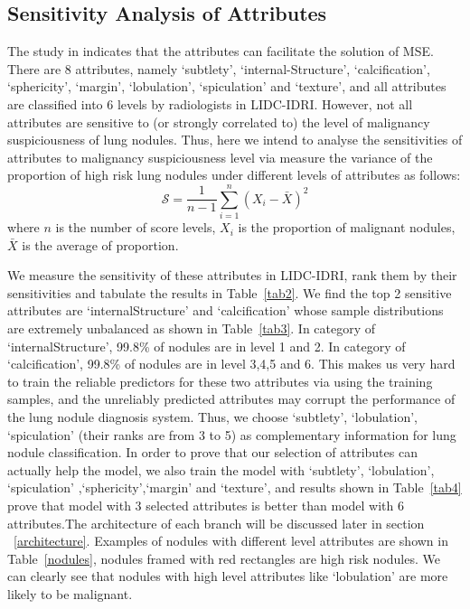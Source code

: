 \documentclass[runningheads]{llncs}
\begin{document}
\subsection{Sensitivity Analysis of Attributes}
\label{select}
The study in \cite{Hussein2017Risk} indicates that the attributes can facilitate the solution of MSE. There are 8 attributes, namely `subtlety', `internal-Structure', `calcification', `sphericity', `margin', `lobulation', `spiculation' and `texture', and all attributes are classified into 6 levels by radiologists in LIDC-IDRI. However, not all attributes are sensitive to (or strongly correlated to) the level of malignancy suspiciousness of lung nodules. Thus, here we intend to analyse the sensitivities of attributes to malignancy suspiciousness level via measure the variance of the proportion of high risk lung nodules under different levels of attributes as follows:
\begin{equation}
\mathcal{S} = \frac{1}{n-1}\sum_{i=1}^n (X_i - \bar{X})^{2}
\end{equation}
where $n$ is the number of score levels,  $X_i$ is the proportion of malignant nodules, $\bar{X}$ is the average of proportion.

We measure the sensitivity of these attributes in LIDC-IDRI, rank them by their sensitivities and tabulate the results in Table~\ref{tab2}. We find the top 2 sensitive attributes are `internalStructure' and `calcification' whose sample distributions are extremely unbalanced as shown in Table~\ref{tab3}.  In category of `internalStructure', 99.8\% of nodules are in level 1 and 2. In category of `calcification', 99.8\% of nodules are in level 3,4,5 and 6. This makes us very hard to train the reliable predictors for these two attributes via using the training samples, and the unreliably predicted attributes may corrupt the performance of the lung nodule diagnosis system. Thus, we choose `subtlety', `lobulation', `spiculation' (their ranks are from 3 to 5) as complementary information for lung nodule classification. In order to prove that our selection of attributes can actually help the model, we also train the model with  `subtlety', `lobulation', `spiculation' ,`sphericity',`margin' and `texture',  and results shown in Table~\ref{tab4} prove that model with 3 selected attributes is better than model with 6 attributes.The architecture of each branch will be discussed later in section ~\ref{architecture}.
Examples of nodules with different level attributes are shown in Table~\ref{nodules}, nodules framed with red rectangles are high risk nodules. We can clearly see that nodules with high level attributes like `lobulation' are more likely to be malignant.
\end{document}
